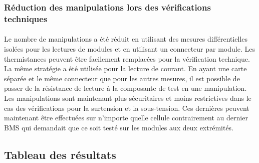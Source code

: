 		\subsubsection{Réduction des manipulations lors des vérifications techniques}
	
			\paragraph{}
			Le nombre de manipulations a été réduit en utilisant des mesures différentielles isolées pour les lectures de modules et en utilisant un connecteur par module. Les thermistances peuvent être facilement remplacées pour la vérification technique. La même stratégie a été utilisée pour la lecture de courant. En ayant une carte séparée et le même connecteur que pour les autres mesures, il est possible de passer de la résistance de lecture à la composante de test en une manipulation. Les manipulations sont maintenant plus sécuritaires et moins restrictives dans le cas des vérifications pour la surtension et la sous-tension. Ces dernières peuvent maintenant être effectuées sur n'importe quelle cellule contrairement au dernier BMS qui demandait que ce soit testé sur les modules aux deux extrémités.


	\subsection{Tableau des résultats}

		\paragraph{}
		
